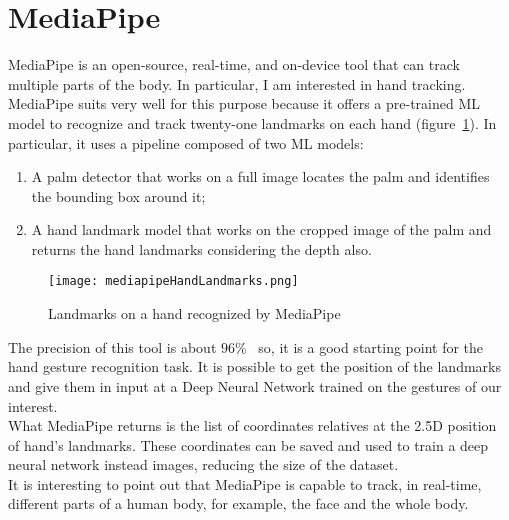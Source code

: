 \documentclass[../thesis.tex]{subfiles}
\begin{document}
\section{MediaPipe}\label{sec:mediapipe}
MediaPipe is an open-source, real-time, and on-device tool that can track multiple parts of the body. In particular, I am interested in hand tracking. MediaPipe suits very well for this purpose because it offers a pre-trained \acrshort{ML} model to recognize and track twenty-one landmarks on each hand (figure~\ref{fig:landmarksMediapipe}). In particular, it uses a pipeline composed of two \acrshort{ML} models:
\begin{enumerate}
    \item A palm detector that works on a full image locates the palm and identifies the bounding box around it;
    \item A hand landmark model that works on the cropped image of the palm and returns the hand landmarks considering the depth also. 
\end{enumerate}
\begin{figure}[H]
    \centering
    \texttt{[image: mediapipeHandLandmarks.png]}
    \caption{Landmarks on a hand recognized by MediaPipe~\cite{site:mediapipe}}
    \label{fig:landmarksMediapipe}
\end{figure}
The precision of this tool is about $96\%$~\cite{paper:mediapipe} so, it is a good starting point for the hand gesture recognition task. It is possible to get the position of the landmarks and give them in input at a Deep Neural Network trained on the gestures of our interest.\\
What MediaPipe returns is the list of coordinates relatives at the 2.5D position of hand's landmarks. These coordinates can be saved and used to train a deep neural network instead images, reducing the size of the dataset.\\
It is interesting to point out that MediaPipe is capable to track, in real-time, different parts of a human body, for example, the face and the whole body.~\cite{site:mediapipe}
\end{document}
